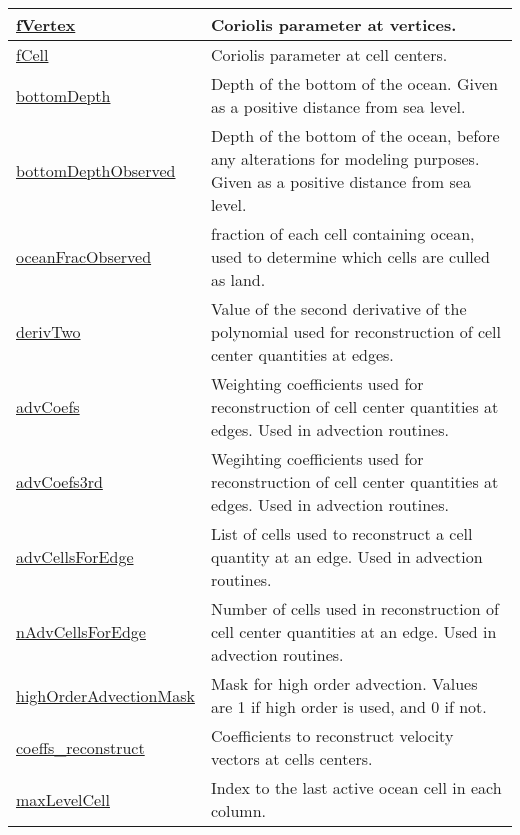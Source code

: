 {\begin{center}
\begin{longtable}{| p{2.0in} | p{4.0in} |}
    \hline
    \hyperref[subsec:var_sec_mesh_fVertex]{fVertex} & Coriolis parameter at vertices. \\
    \hline
    \hyperref[subsec:var_sec_mesh_fCell]{fCell} & Coriolis parameter at cell centers. \\
    \hline
    \hyperref[subsec:var_sec_mesh_bottomDepth]{bottomDepth} & Depth of the bottom of the ocean. Given as a positive distance from sea level. \\
    \hline
    \hyperref[subsec:var_sec_mesh_bottomDepthObserved]{bottomDepthObserved} & Depth of the bottom of the ocean, before any alterations for modeling purposes. Given as a positive distance from sea level. \\
    \hline
    \hyperref[subsec:var_sec_mesh_oceanFracObserved]{oceanFracObserved} & fraction of each cell containing ocean, used to determine which cells are culled as land. \\
    \hline
    \hyperref[subsec:var_sec_mesh_derivTwo]{derivTwo} & Value of the second derivative of the polynomial used for reconstruction of cell center quantities at edges. \\
    \hline
    \hyperref[subsec:var_sec_mesh_advCoefs]{advCoefs} & Weighting coefficients used for reconstruction of cell center quantities at edges. Used in advection routines. \\
    \hline
    \hyperref[subsec:var_sec_mesh_advCoefs3rd]{advCoefs3rd} & Wegihting coefficients used for reconstruction of cell center quantities at edges. Used in advection routines. \\
    \hline
    \hyperref[subsec:var_sec_mesh_advCellsForEdge]{advCellsForEdge} & List of cells used to reconstruct a cell quantity at an edge. Used in advection routines. \\
    \hline
    \hyperref[subsec:var_sec_mesh_nAdvCellsForEdge]{nAdvCellsForEdge} & Number of cells used in reconstruction of cell center quantities at an edge. Used in advection routines. \\
    \hline
    \hyperref[subsec:var_sec_mesh_highOrderAdvectionMask]{highOrderAdvectionMask} & Mask for high order advection. Values are 1 if high order is used, and 0 if not. \\
    \hline
    \hyperref[subsec:var_sec_mesh_coeffs_reconstruct]{coeffs\_reconstruct} & Coefficients to reconstruct velocity vectors at cells centers. \\
    \hline
    \hyperref[subsec:var_sec_mesh_maxLevelCell]{maxLevelCell} & Index to the last active ocean cell in each column. \\

\end{longtable}
\end{center}}
